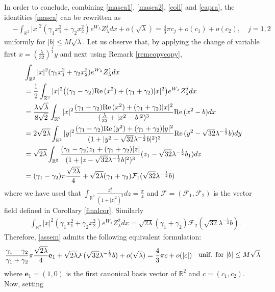 \documentclass[reqno,11pt]{amsart}
\theoremstyle{definition}
\numberwithin{equation}{section}
\newcommand{\cal}{\mathcal }
\newcommand{\intr}{\int_{\R^2}}
\newcommand{\R}{\mathbb{R}}
\newcommand{\la}{\lambda}
\renewcommand{\(}{\left(}
\renewcommand{\)}{\right)}
\renewcommand{\[}{\left[}
\renewcommand{\]}{\right]}
\newcommand{\beq}{\begin{equation}}
\newcommand{\eeq}{\end{equation}}
\def\Re{{\rm Re}\,}
\begin{document}
{In order to conclude, combining \eqref{masca1}, \eqref{masca2}, \eqref{coll} and  \eqref{capra},  
 the identities \eqref{masca} 
can be rewritten as
\beq\label{assem}\begin{aligned} &-\intr |x|^2(\gamma_1 x_1^2+\gamma_2 x_2^2)e^{W_\la}Z_\la^j dx+o(\sqrt\la)
=\frac{4}{3}\pi c_j+o(c_1)+o(c_2), \quad j=1,2\end{aligned}\eeq uniformly for $|b|\leq M\sqrt\la$.
Let us observe that, by applying the change of variable first $x=(\frac{\la}{32})^{\frac14}y$ and next using Remark \ref{remcopycopy},  $$\begin{aligned}&\intr |x|^2(\gamma_1 x_1^2+\gamma_2 x_2^2)e^{W_\la}Z_\la^1 dx\\&=\frac12\intr |x|^2\big((\gamma_1-\gamma_2)\Re(x^2)+(\gamma_1+\gamma_2)|x|^2\big)e^{W_\la}Z_\la^j dx
\\ &
=\frac{\la\sqrt\la}{8\sqrt2} \intr |x|^2\frac{(\gamma_1-\gamma_2)\Re(x^2)+(\gamma_1+\gamma_2)|x|^2}{(\frac{\la}{32}+|x^2-b|^2)^3}\Re(x^2-b)dx
\\ & =2\sqrt{2\la} \intr |y|^2\frac{(\gamma_1-\gamma_2)\Re(y^2)+(\gamma_1+\gamma_2)|y|^2}{(1+|y^2-\sqrt{32}\la^{-\frac12}b|^2)^3}\Re(y^2-\sqrt{32}\la^{-\frac12}b)dy
\\ &=\sqrt{2\la}\intr \frac{(\gamma_1-\gamma_2)z_1+(\gamma_1+\gamma_2)|z|}{(1+|z-\sqrt{32}\la^{-\frac12}b|^2)^3}(z_1-\sqrt{32}\la^{-\frac12}b_1)dz
\\ &=(\gamma_1-\gamma_2)\pi\frac{\sqrt{2\la}}{4}+\sqrt{2\la}(\gamma_1+\gamma_2){\cal F}_1(\sqrt{32}\la^{-\frac12}b) \end{aligned}
$$ where we have used that $\intr \frac{z_1^2}{(1+|z|^2)^3}dz=\frac{\pi}{4}$ and ${\cal F}=({\cal F}_1,{\cal F}_2)$ is the vector field defined in Corollary \ref{finalcor}.  Similarly
$$\begin{aligned}&\intr |x|^2(\gamma_1 x_1^2+\gamma_2 x_2^2)e^{W_\la}Z_\la^2 dx=\sqrt{2\la}(\gamma_1+\gamma_2){\cal F}_2(\sqrt{32}\la^{-\frac12}b).\end{aligned}
$$
Therefore, \eqref{assem} admits the following equivalent formulation:
\beq\label{tccone}\begin{aligned}\frac{\gamma_1-\gamma_2}{\gamma_1+\gamma_2}\pi\frac{\sqrt{2\la}}{4}\mathbf{e}_1+\sqrt{2\la}{\cal F}(\sqrt{32}\la^{-\frac12}b)+o(\sqrt\la)&=\frac{4}{3}\pi c+ o(|c|)\\ 
\end{aligned}\;\;
\hbox{ unif. for }|b|\leq M\sqrt\la\eeq
where ${\mathbf e}_1=(1,0)$ is the first canonical basis vector of  $\R^2$ and  $c=(c_1,c_2)$. 
Now, setting
}
\end{document}
